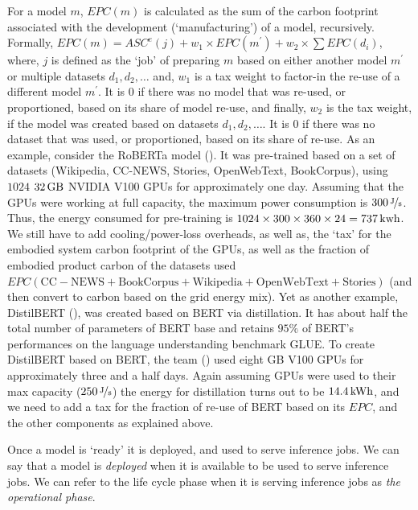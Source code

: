 {{        For a model $m$, $EPC \! \left ( m \right )$ is calculated as the sum of the carbon footprint associated with the development (`manufacturing') of a model, recursively. Formally, $EPC \! \left ( m \right ) = ASC^{e} \! \left ( j \right ) + w_{1} \times EPC \! \left ( m^{\prime} \right ) + w_2 \times \sum EPC \! \left ( d_{i} \right )$, where, $j$ is defined as the `job' of preparing $m$ based on either another model $m^{\prime}$ or multiple datasets $d_{1}, d_{2}, \dots$ and,  $w_{1}$ is a tax weight to factor-in the re-use of a different model $m^{\prime}$. It is $0$ if there was no model that was re-used, or proportioned, based on its share of model re-use, and finally, $w_{2}$ is the tax weight, if the model was created based on datasets $d_{1}, d_{2}, \dots$. It is $0$ if there was no dataset that was used, or proportioned, based on its share of re-use. As an example, consider the RoBERTa model (\cite{Liu2019}). It was pre-trained based on a set of datasets (Wikipedia, CC-NEWS, Stories, OpenWebText, BookCorpus), using $1024$ $\unit[32]{GB}$ NVIDIA V100 GPUs for approximately one day. Assuming that the GPUs were working at full capacity, the maximum power consumption is $\unitfrac[300]{J}{s}$. Thus, the energy consumed for pre-training is $1024 \times 300 \times 360 \times 24 = \unit[737]{kwh}$. We still have to add cooling/power-loss overheads, as well as, the `tax' for the embodied system carbon footprint of the GPUs, as well as the fraction of embodied product carbon of the datasets used $EPC \! \left ( \text{CC} - \text{NEWS} + \text{BookCorpus} + \text{Wikipedia} + \text{OpenWebText} + \text{Stories} \right )$ (and then convert to carbon based on the grid energy mix). Yet as another example, DistilBERT (\cite{Sanh2019}), was created based on BERT via distillation. It has about half the total number of parameters of BERT base and retains $95\%$ of BERT’s performances on the language understanding benchmark GLUE. To create DistilBERT based on BERT, the team (\cite{Sanh2019}) used eight \unit[16]{GB} V100 GPUs for approximately three and a half days. Again assuming GPUs were used to their max capacity ($\unitfrac[250]{J}{s}$) the energy for distillation turns out to be $\unit[14.4]{kWh}$, and we need to add a tax for the fraction of re-use of BERT based on its $EPC$, and the other components as explained above.

        Once a model is `ready' it is deployed, and used to serve inference jobs. We can say that a model is \textit{deployed} when it is available to be used to serve inference jobs. We can refer to the life cycle phase when it is serving inference jobs as \textit{the operational phase}.
        
}}
